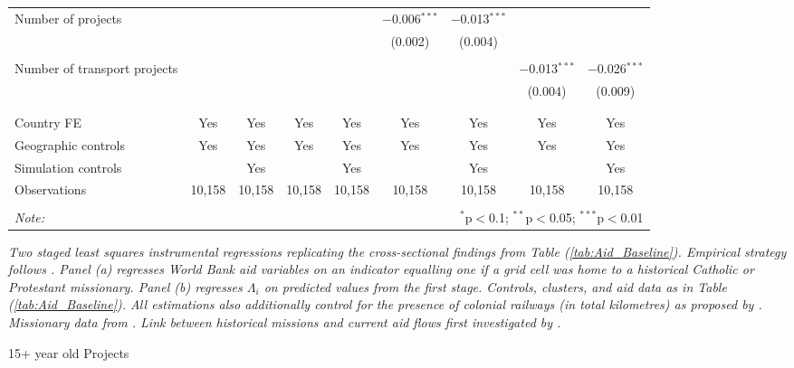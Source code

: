 \documentclass[11pt, oneside]{article}   	%
\let\oldref\ref
\renewcommand{\ref}[1]{(\oldref{#1})}
\newcommand{\mysubcaption}[1]{
\justify
\begin{spacing}{0.7}
\textit{\footnotesize #1}
\end{spacing}}
\begin{document}
\begin{spacing}{1.3}
\begin{table}[!h]
{\begin{tabular}{@{\extracolsep{5pt}}lcccccccc}
Number of projects &  &  &  &  & $-$0.006$^{***}$ & $-$0.013$^{***}$ &  &  \\
 &  &  &  &  & (0.002) & (0.004) &  &  \\
 & & & & & & & & \\
Number of transport projects &  &  &  &  &  &  & $-$0.013$^{***}$ & $-$0.026$^{***}$ \\
 &  &  &  &  &  &  & (0.004) & (0.009) \\
 & & & & & & & & \\
\hline \\[-1.8ex]
Country FE & Yes & Yes & Yes & Yes & Yes & Yes & Yes & Yes \\
Geographic controls & Yes & Yes & Yes & Yes & Yes & Yes & Yes & Yes \\
Simulation controls &  & Yes &  & Yes &  & Yes &  & Yes \\
Observations & 10,158 & 10,158 & 10,158 & 10,158 & 10,158 & 10,158 & 10,158 & 10,158 \\
 \hline
 \hline \\[-1.8ex]
 \textit{Note:}  & \multicolumn{8}{r}{$^{*}$p$<$0.1; $^{**}$p$<$0.05; $^{***}$p$<$0.01} \\
 \end{tabular}


}

\mysubcaption{Two staged least squares instrumental regressions replicating the cross-sectional findings from Table \ref{tab:Aid_Baseline}. Empirical strategy follows \cite{Castello-Climent_HigherEducationProsperity_2017}. Panel (a) regresses World Bank aid variables on an indicator equalling one if a grid cell was home to a historical Catholic or Protestant missionary. Panel (b) regresses $\Lambda_{i}$ on predicted values from the first stage. Controls, clusters, and aid data as in Table \ref{tab:Aid_Baseline}. All estimations also additionally control for the presence of colonial railways (in total kilometres) as proposed by \citeauthor{Castello-Climent_HigherEducationProsperity_2017}. Missionary data from \cite{Nunn_ReligiousConversionColonial_2010}. Link between historical missions and current aid flows first investigated by \cite{Alpino_LightingPathInfluence_2017}.}
\end{table}

\begin{table}[h] \centering
  \caption{15+ year old Projects}
  \label{tab:APP:old_projects}
  \resizebox{\textwidth}{!}{


}
\end{table}
\end{spacing}
\end{document}

